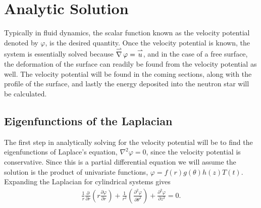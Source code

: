 %
%
%
%
%
%
%
%
%

\chapter{Analytic Solution}

Typically in fluid dynamics, the scalar function known as the velocity potential denoted by $\varphi$, is the desired quantity. Once the velocity potential is known, the system is essentially solved because  $\operatorname{\overset{\rightharpoonup}\nabla} \varphi = \overset{\rightharpoonup}u$, and in the case of a free surface, the deformation of the surface can readily be found from the velocity potential as well. The velocity potential will be found in the coming sections, along with the profile of the surface, and lastly the energy deposited into the neutron star will be calculated.

\section{Eigenfunctions of the Laplacian}

The first step in analytically solving for the velocity potential will be to find the eigenfunctions of Laplace's equation, $\nabla^2 \varphi = 0$, since the velocity potential is conservative. Since this is a partial differential equation we will assume the solution is the product of univariate functions, $\varphi = f(r) g(\theta) h(z) T(t)$. Expanding the Laplacian for cylindrical systems gives 
\begin{align*}
\frac{1}{r}\frac{\partial}{\partial r} \left( r \frac{\partial \varphi}{\partial r} \right) + \frac{1}{r^2} \left( \frac{\partial^2 \varphi}{\partial \theta^2} \right) + \frac{\partial^2 \varphi}{\partial z^2} = 0.
\end{align*}

